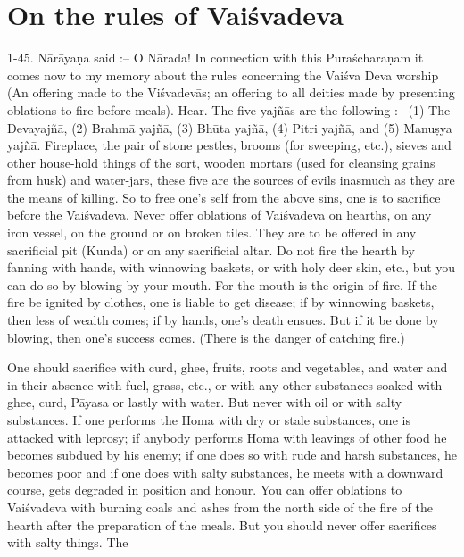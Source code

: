 \chapter{On the rules of Vai\'svadeva}

1-45. N\=ar\=aya\d{n}a said :-- O N\=arada! In connection with this Pura\'schara\d{n}am it comes now to my memory about the rules concerning the Vai\'sva Deva worship (An offering made to the Vi\'svadev\=as; an offering to all deities made by presenting oblations to fire before meals). Hear. The five yaj\~n\=as are the following :-- (1) The Devayaj\~n\=a, (2) Brahm\=a yaj\~n\=a, (3) Bh\=uta yaj\~n\=a, (4) Pitri yaj\~n\=a, and (5) Manu\d{s}ya yaj\~n\=a. Fireplace, the pair of stone pestles, brooms (for sweeping, etc.), sieves and other house-hold things of the sort, wooden mortars (used for cleansing grains from husk) and water-jars, these five are the sources of evils inasmuch as they are the means of killing. So to free one's self from the above sins, one is to sacrifice before the Vai\'svadeva. Never offer oblations of Vai\'svadeva on hearths, on any iron vessel, on the ground or on broken tiles. They are to be offered in any sacrificial pit (Kunda) or on any sacrificial altar. Do not fire the hearth by fanning with hands, with winnowing baskets, or with holy deer skin, etc., but you can do so by blowing by your mouth. For the mouth is the origin of fire. If the fire be ignited by clothes, one is liable to get disease; if by winnowing baskets, then less of wealth comes; if by hands, one's death ensues. But if it be done by blowing, then one's success comes. (There is the danger of catching fire.)

One should sacrifice with curd, ghee, fruits, roots and vegetables, and water and in their absence with fuel, grass, etc., or with any other substances soaked with ghee, curd, P\=ayasa or lastly with water. But never with oil or with salty substances. If one performs the Homa with dry or stale substances, one is attacked with leprosy; if anybody performs Homa with leavings of other food he becomes subdued by his enemy; if one does so with rude and harsh substances, he becomes poor and if one does with salty substances, he meets with a downward course, gets degraded in position and honour. You can offer oblations to Vai\'svadeva with burning coals and ashes from the north side of the fire of the hearth after the preparation of the meals. But you should never offer sacrifices with salty things. The

